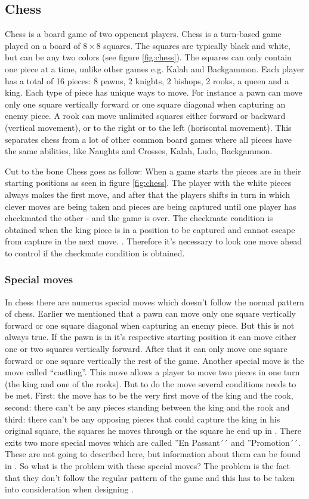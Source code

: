 \subsection{Chess}
Chess is a board game of two oppenent players. Chess is a turn-based game played on a board of $8 \times 8$ squares. The squares are typically black and white, but can be any two colors (see figure \ref{fig:chess}). The squares can only contain one piece at a time, unlike other games e.g. Kalah and Backgammon. Each player has a total of 16 pieces: 8 pawns, 2 knights, 2 bishops, 2 rooks, a queen and a king. Each type of piece has unique ways to move. For instance a pawn can move only one square vertically forward or one square diagonal when capturing an enemy piece. A rook can move unlimited squares either forward or backward (vertical movement), or to the right or to the left (horisontal movement). This separates chess from a lot of other common board games where all pieces have the same abilities, like Naughts and Crosses, Kalah, Ludo, Backgammon.  

Cut to the bone Chess goes as follow: When a game starts the pieces are in their starting positions as seen in figure \ref{fig:chess}. The player with the white pieces always makes the first move, and after that the players shifts in turn in which clever moves are being taken and pieces are being captured until one player has checkmated the other - and the game is over. The checkmate condition is obtained when the king piece is in a position to be captured and cannot escape from capture in the next move. \cite{chessrules}. Therefore it's necessary to look one move ahead to control if the checkmate condition is obtained.

\subsubsection{Special moves} 
In chess there are numerus special moves which doesn't follow the normal pattern of chess. Earlier we mentioned that a pawn can move only one square vertically forward or one square diagonal when capturing an enemy piece. But this is not always true. If the pawn is in it's respective starting position it can move either one or two squares vertically forward. After that it can only move one square forward or one square vertically the rest of the game. Another special move is the move called ``castling''. This move allows a player to move two pieces in one turn (the king and one of the rooks). But to do the move several conditions needs to be met. First: the move has to be the very first move of the king and the rook, second: there can't be any pieces standing between the king and the rook and third: there can't be any opposing pieces that could capture the king in his original square, the squares he moves through or the square he end up in \cite{chessrules}. There exits two more special moves which are called ''En Passant´´ and ''Promotion´´. These are not going to described here, but information about them can be found in \cite{chessrules}. So what is the problem with these special moves? The problem is the fact that they don't follow the regular pattern of the game and this has to be taken into consideration when designing \productname{}.

